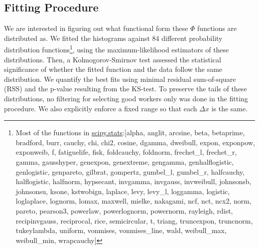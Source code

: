 \documentclass[12pt]{article}
\begin{document}
\subsection{Fitting Procedure}
We are interested in figuring out what functional form these $\Phi$ functions are distributed as. We fitted the histograms against 84 different probability distribution functions\footnote{Most of the functions in  \href{https://docs.scipy.org/doc/scipy/reference/stats.html}{scipy.stats}:\tiny{[alpha, anglit, arcsine, beta, betaprime, bradford, burr, cauchy, chi, chi2, cosine, dgamma, dweibull, expon, exponpow, exponweib, f, fatiguelife, fisk, foldcauchy, foldnorm, frechet\_l, frechet\_r, gamma, gausshyper, genexpon, genextreme, gengamma, genhalflogistic, genlogistic, genpareto, gilbrat, gompertz, gumbel\_l, gumbel\_r, halfcauchy, halflogistic, halfnorm, hypsecant, invgamma, invgauss, invweibull, johnsonsb, johnsonsu, ksone, kstwobign, laplace, levy, levy\_l, loggamma, logistic, loglaplace, lognorm, lomax, maxwell, mielke, nakagami, ncf, nct, ncx2, norm, pareto, pearson3, powerlaw, powerlognorm, powernorm, rayleigh, rdist, recipinvgauss, reciprocal, rice, semicircular, t, triang, truncexpon, truncnorm, tukeylambda, uniform, vonmises, vonmises\_line, wald, weibull\_max, weibull\_min, wrapcauchy]}}, using the maximum-likelihood estimators of these distributions. Then, a  Kolmogorov-Smirnov test  assessed the statistical significance of whether the fitted function and the data follow the same distribution. We quantify the best fits using minimal residual sum-of-square (RSS) and the p-value resulting from the KS-test.  To preserve the tails of these distributions, no filtering for selecting good workers only was done in the fitting procedure. We also explicitly enforce a fixed range so that each $\Delta x$  is the same. 
\end{document}
